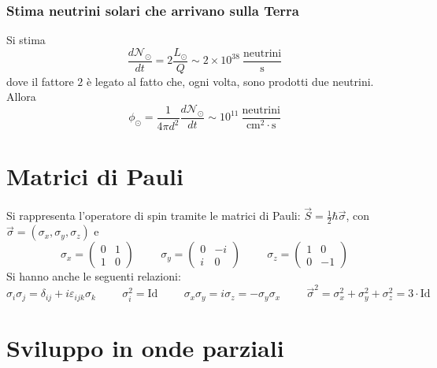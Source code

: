 \documentclass[11pt, a4paper]{scrartcl}
\theoremstyle{style}
\numberwithin{equation}{subsection}
\begin{document}
\subsubsection{Stima neutrini solari che arrivano sulla Terra}
Si stima
\[
\frac{d \mathcal{N} _\odot }{d t}  = 2 \frac{L_\odot }{Q} \sim 2 \times 10^{38}~ \frac{\text{neutrini}}{\text{s}}
\] 
dove il fattore $2$ \`e legato al fatto che, ogni volta, sono prodotti due neutrini.
Allora
\[
\phi _\odot  = \frac{1}{4\pi d^2} \frac{d \mathcal{N} _\odot }{d t}  \sim 10^{11} ~ \frac{\text{neutrini}}{\text{cm}^2 \cdot \text{s}}
\] 















\newpage
\appendix
\section{Matrici di Pauli}

Si rappresenta l'operatore di spin tramite le matrici di Pauli: $\vec{S} = \frac{1}{2}\hbar \vec{\sigma }$, con $\vec{\sigma }= (\sigma _x, \sigma _y, \sigma _z)$ e 
\[
	\sigma _x = \begin{pmatrix} 0 & 1 \\ 1 & 0  \end{pmatrix}  \hspace{1cm} \sigma _y = \begin{pmatrix} 0& - i \\ i & 0  \end{pmatrix} \hspace{1cm}\sigma _z = \begin{pmatrix} 1 & 0 \\ 0 & -1  \end{pmatrix} 
\] 
Si hanno anche le seguenti relazioni:
\[
\sigma _i \sigma _j = \delta _{ij} + i \varepsilon _{ijk} \sigma _k \hspace{1cm}\sigma _i^2 = \mathrm{Id} \hspace{1cm} \sigma _x\sigma _y = i \sigma _z = - \sigma _y \sigma _x \hspace{1cm} \vec{\sigma}^2 = \sigma _x^2 + \sigma _y^2 + \sigma ^2_z = 3\cdot  \mathrm{Id} 
\] 

\section{Sviluppo in onde parziali}
\end{document}
